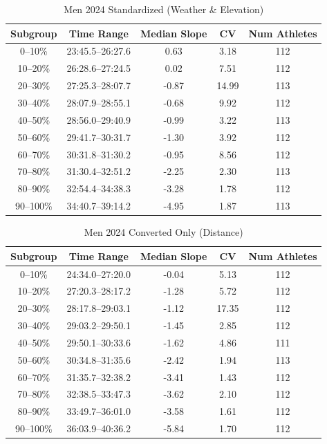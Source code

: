 \documentclass[suppldata]{interact}
\theoremstyle{plain}%
\theoremstyle{definition}
\theoremstyle{remark}
\begin{document}
\begin{table}[htbp]
\renewcommand{\arraystretch}{1.1}
\begin{tabular}{c c c c c}
\toprule
Subgroup& Time Range & Median Slope & CV& Num Athletes \\
\midrule
0--10\%   & 23:45.5--26:27.6 &  0.63 & 3.18  & 112 \\
    10--20\%  & 26:28.6--27:24.5 &  0.02 & 7.51  & 112 \\
    20--30\%  & 27:25.3--28:07.7 & -0.87 & 14.99 & 113 \\
    30--40\%  & 28:07.9--28:55.1 & -0.68 & 9.92  & 112 \\
    40--50\%  & 28:56.0--29:40.9 & -0.99 & 3.22  & 113 \\
    50--60\%  & 29:41.7--30:31.7 & -1.30 & 3.92  & 112 \\
    60--70\%  & 30:31.8--31:30.2 & -0.95 & 8.56  & 112 \\
    70--80\%  & 31:30.4--32:51.2 & -2.25 & 2.30  & 113 \\
    80--90\%  & 32:54.4--34:38.3 & -3.28 & 1.78  & 112 \\
    90--100\% & 34:40.7--39:14.2 & -4.95 & 1.87  & 113 \\ 
\bottomrule
\end{tabular}
\centering
\caption{Men 2024 Standardized (Weather \& Elevation)}
\label{tab:2024_stand}
\end{table}

\begin{table}[htbp]
\renewcommand{\arraystretch}{1.1}
\begin{tabular}{c c c c c}
\toprule
Subgroup& Time Range & Median Slope & CV& Num Athletes \\
\midrule
0--10\%   & 24:34.0--27:20.0 & -0.04 & 5.13  & 112 \\
    10--20\%  & 27:20.3--28:17.2 & -1.28 & 5.72  & 112 \\
    20--30\%  & 28:17.8--29:03.1 & -1.12 & 17.35 & 112 \\
    30--40\%  & 29:03.2--29:50.1 & -1.45 & 2.85  & 112 \\
    40--50\%  & 29:50.1--30:33.6 & -1.62 & 4.86  & 111 \\
    50--60\%  & 30:34.8--31:35.6 & -2.42 & 1.94  & 113 \\
    60--70\%  & 31:35.7--32:38.2 & -3.41 & 1.43  & 112 \\
    70--80\%  & 32:38.5--33:47.3 & -3.62 & 2.10  & 112 \\
    80--90\%  & 33:49.7--36:01.0 & -3.58 & 1.61  & 112 \\
    90--100\% & 36:03.9--40:36.2 & -5.84 & 1.70  & 112 \\
\bottomrule
\end{tabular}
\centering
\caption{Men 2024 Converted Only (Distance)}
\label{tab:2024_converted}
\end{table}
\end{document}
